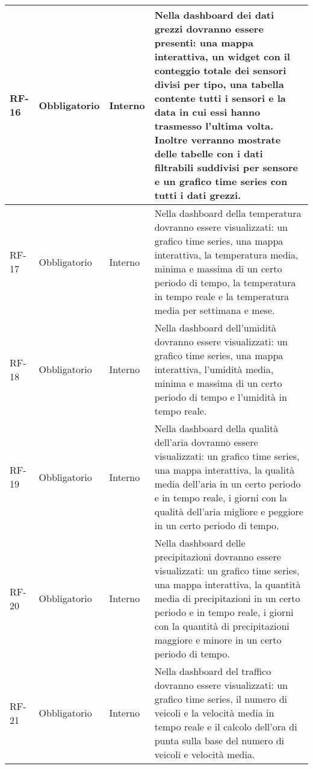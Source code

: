 \begin{longtable}{|>{\centering\arraybackslash}m{}|>{\centering\arraybackslash}m{}|>{\centering\arraybackslash}m{}|>{\centering\arraybackslash}m{}|}
	RF-16           & Obbligatorio        & Interno        & Nella dashboard dei dati grezzi dovranno essere presenti: una mappa interattiva, un widget con il conteggio totale dei sensori divisi per tipo, una tabella contente tutti i sensori e la data in cui essi hanno trasmesso l'ultima volta. Inoltre verranno mostrate delle tabelle con i dati filtrabili suddivisi per sensore e un grafico time series con tutti i dati grezzi. \\\hline
	RF-17           & Obbligatorio        & Interno        & Nella dashboard della temperatura dovranno essere visualizzati: un grafico time series, una mappa interattiva, la temperatura media, minima e massima di un certo periodo di tempo, la temperatura in tempo reale e la temperatura media per settimana e mese.                                                                                                                   \\\hline
	RF-18           & Obbligatorio        & Interno        & Nella dashboard dell'umidità dovranno essere visualizzati: un grafico time series, una mappa interattiva, l'umidità media, minima e massima di un certo periodo di tempo e l'umidità in tempo reale.                                                                                                                                                                             \\\hline
	RF-19           & Obbligatorio        & Interno        & Nella dashboard della qualità dell'aria dovranno essere visualizzati: un grafico time series, una mappa interattiva, la qualità media dell'aria in un certo periodo e in tempo reale, i giorni con la qualità dell'aria migliore e peggiore in un certo periodo di tempo.                                                                                                        \\\hline
	RF-20           & Obbligatorio        & Interno        & Nella dashboard delle precipitazioni dovranno essere visualizzati: un grafico time series, una mappa interattiva, la quantità media di precipitazioni in un certo periodo e in tempo reale, i giorni con la quantità di precipitazioni maggiore e minore in un certo periodo di tempo.                                                                                           \\\hline
	RF-21           & Obbligatorio        & Interno        & Nella dashboard del traffico dovranno essere visualizzati: un grafico time series, il numero di veicoli e la velocità media in tempo reale e il calcolo dell'ora di punta sulla base del numero di veicoli e velocità media.                                                                                                                                                     \\\hline

\end{longtable}
